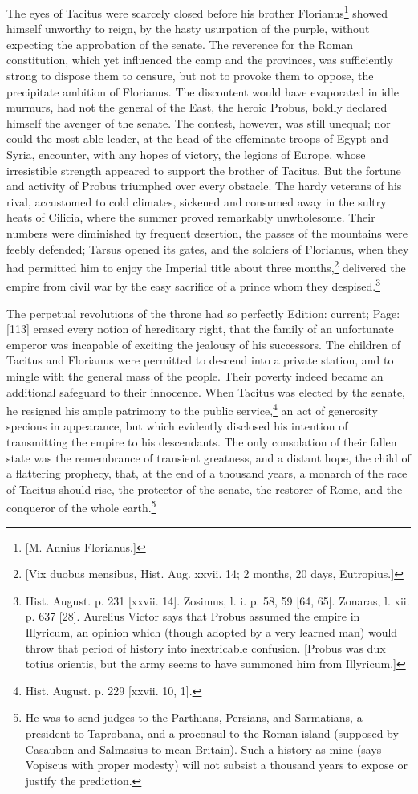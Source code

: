 The eyes of Tacitus were scarcely closed before his brother Florianus\footnote{[M. Annius Florianus.]} showed himself unworthy to reign, by the hasty usurpation of the purple, without expecting the approbation of the senate. The reverence for the Roman constitution, which yet influenced the camp and the provinces, was sufficiently strong to dispose them to censure, but not to provoke them to oppose, the precipitate ambition of Florianus. The discontent would have evaporated in idle murmurs, had not the general of the East, the heroic Probus, boldly declared himself the avenger of the senate. The contest, however, was still unequal; nor could the most able leader, at the head of the effeminate troops of Egypt and Syria, encounter, with any hopes of victory, the legions of Europe, whose irresistible strength appeared to support the brother of Tacitus. But the fortune and activity of Probus triumphed over every obstacle. The hardy veterans of his rival, accustomed to cold climates, sickened and consumed away in the sultry heats of Cilicia, where the summer proved remarkably unwholesome. Their numbers were diminished by frequent desertion, the passes of the mountains were feebly defended; Tarsus opened its gates, and the soldiers of Florianus, when they had permitted him to enjoy the Imperial title about three months,\footnote{[Vix duobus mensibus, Hist. Aug. xxvii. 14; 2 months, 20 days, Eutropius.]} delivered the empire from civil war by the easy sacrifice of a prince whom they despised.\footnote{Hist. August. p. 231 [xxvii. 14]. Zosimus, l. i. p. 58, 59 [64, 65]. Zonaras, l. xii. p. 637 [28]. Aurelius Victor says that Probus assumed the empire in Illyricum, an opinion which (though adopted by a very learned man) would throw that period of history into inextricable confusion. [Probus was dux totius orientis, but the army seems to have summoned him from Illyricum.]}

The perpetual revolutions of the throne had so perfectly Edition: current; Page: [113] erased every notion of hereditary right, that the family of an unfortunate emperor was incapable of exciting the jealousy of his successors. The children of Tacitus and Florianus were permitted to descend into a private station, and to mingle with the general mass of the people. Their poverty indeed became an additional safeguard to their innocence. When Tacitus was elected by the senate, he resigned his ample patrimony to the public service,\footnote{Hist. August. p. 229 [xxvii. 10, 1].} an act of generosity specious in appearance, but which evidently disclosed his intention of transmitting the empire to his descendants. The only consolation of their fallen state was the remembrance of transient greatness, and a distant hope, the child of a flattering prophecy, that, at the end of a thousand years, a monarch of the race of Tacitus should rise, the protector of the senate, the restorer of Rome, and the conqueror of the whole earth.\footnote{He was to send judges to the Parthians, Persians, and Sarmatians, a president to Taprobana, and a proconsul to the Roman island (supposed by Casaubon and Salmasius to mean Britain). Such a history as mine (says Vopiscus with proper modesty) will not subsist a thousand years to expose or justify the prediction.}

